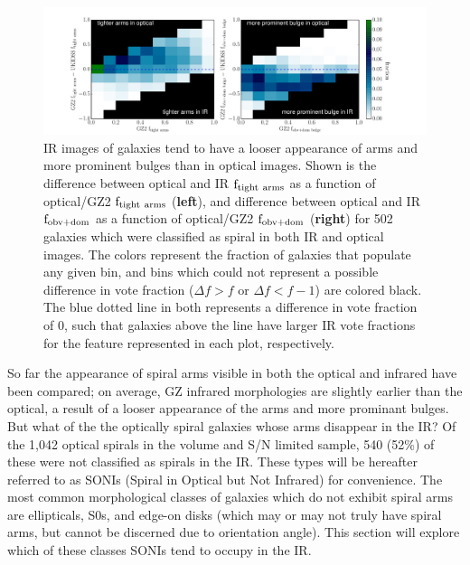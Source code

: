 \begin{figure}
\centering
\includegraphics[width=1\textwidth,trim={4cm 0cm 4cm 0cm},clip]{figures/t_type.pdf}
\caption{IR images of galaxies tend to have a looser appearance of arms and more prominent bulges than in optical images. Shown is the difference between optical and IR $\rm f_{tight~arms}$ as a function of optical/GZ2 $\rm f_{tight~arms}$ (\textbf{left}), and difference between optical and IR $\rm f_{obv+dom}$ as a function of optical/GZ2 $\rm f_{obv+dom}$ (\textbf{right}) for 502 galaxies which were classified as spiral in both IR and optical images. The colors represent the fraction of galaxies that populate any given bin, and bins which could not represent a possible difference in vote fraction ($\Delta f > f$ or $\Delta f < f-1$) are colored black. The blue dotted line in both represents a difference in vote fraction of 0, such that galaxies above the line have larger IR vote fractions for the feature represented in each plot, respectively.}
\label{fig:ttype}
\end{figure}

So far the appearance of spiral arms visible in both the optical and infrared have been compared; on average, GZ infrared morphologies are slightly earlier than the optical, a result of a looser appearance of the arms and more prominant bulges. But what of the the optically spiral galaxies whose arms disappear in the IR? Of the 1,042 optical spirals in the volume and S/N limited sample, 540 (52\%) of these were not classified as spirals in the IR. These types will be hereafter referred to as SONIs (Spiral in Optical but Not Infrared) for convenience. The most common morphological classes of galaxies which do not exhibit spiral arms are ellipticals, S0s, and edge-on disks (which may or may not truly have spiral arms, but cannot be discerned due to orientation angle). This section will explore which of these classes SONIs tend to occupy in the IR. 

